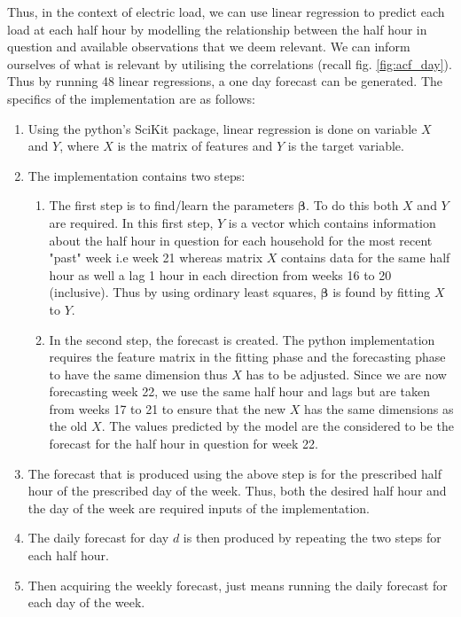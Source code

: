 Thus, in the context of electric load, we can use linear regression to predict each load at each half hour by modelling the relationship between the half hour in question and available observations that we deem relevant. We can inform ourselves of what is relevant by utilising the correlations (recall fig. \ref{fig:acf_day}). Thus by running 48 linear regressions, a one day forecast can be generated. The specifics of the implementation are as follows:
\begin{enumerate}
\item Using the python's SciKit package, linear regression is done on variable $X$ and $Y$, where $X$ is the matrix of features and $Y$ is the target variable.
\item The implementation contains two steps: \begin{enumerate} \item The first step is to find/learn the parameters $\boldsymbol \beta$. To do this both $X$ and $Y$ are required. In this first step, $Y$ is a vector which contains information about the half hour in question for each household for the most recent "past" week i.e week 21 whereas matrix $X$ contains data for the same half hour as well a lag 1 hour in each direction from weeks 16 to 20 (inclusive). Thus by using ordinary least squares, $\boldsymbol \beta$ is found by fitting $X$ to $Y$.
\item In the second step, the forecast is created. The python implementation requires the feature matrix in the fitting phase and the forecasting phase to have the same dimension thus $X$ has to be adjusted. Since we are now forecasting week 22, we use the same half hour and lags but are taken from weeks 17 to 21 to ensure that the new $X$ has the same dimensions as the old $X$. The values predicted by the model are the considered to be the forecast for the half hour in question for week 22. \end{enumerate}
\item The forecast that is produced using the above step is for the prescribed half hour of the prescribed day of the week. Thus, both the desired half hour and the day of the week are required inputs of the implementation.
\item The daily forecast for day $d$ is then produced by repeating the two steps for each half hour.
\item Then acquiring the weekly forecast, just means running the daily forecast for each day of the week.
\end{enumerate}

